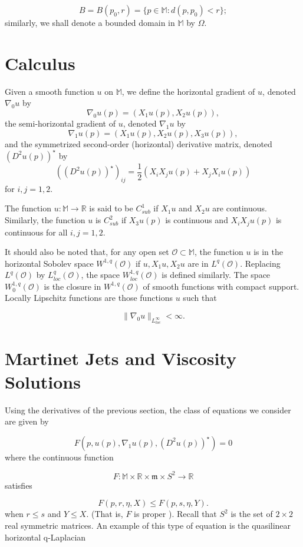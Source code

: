 \documentclass[reqno]{amsart}
\begin{document}
\[B=B(p_0,r)=\{p\in\mathbb{M}:d(p,p_0)<r\};\]
similarly, we shall denote a bounded domain in $\mathbb{M}$ by $\Omega$.
\section{Calculus}
Given a smooth function $u$ on $\mathbb{M}$, we define the horizontal gradient of $u$, denoted $\nabla_0u$ by 
\[\nabla_0u(p)=(X_1u(p),X_2u(p)),\]
the semi-horizontal gradient of $u$, denoted $\nabla_1u$ by 
\[\nabla_1u(p)=(X_1u(p),X_2u(p), X_3u(p)),\]
and the symmetrized second-order (horizontal) derivative matrix, denoted $(D^2u(p))^\star$ by
\[((D^2u(p))^\star)_{ij}=\frac{1}{2}(X_iX_ju(p)+X_jX_iu(p))\]
for $i,j=1,2$.

\begin{definition}
The function $u:\mathbb{M}\to\mathbb{R}$ is said to be $C_{sub}^1$ if $X_1u$ and $X_2u$ are continuous. Similarly, the function $u$ is $C_{sub}^2$ if $X_3u(p)$ is continuous and $X_iX_ju(p)$ is continuous for all $i,j=1,2$.
\end{definition}

It should also be noted that, for any open set $\mathcal{O}\subset\mathbb{M}$, the function $u$ is in the horizontal Sobolev space $W^{1,q}(\mathcal{O})$ if $u, X_1u,X_2u$ are in $L^q(\mathcal{O})$. Replacing $L^q(\mathcal{O})$ by $L^q_{loc}(\mathcal{O})$, the space $W^{1,q}_{loc}(\mathcal{O})$ is defined similarly. The space $W^{1,q}_0(\mathcal{O})$ is the closure in $W^{1,q}(\mathcal{O})$ of smooth functions with compact support. Locally Lipschitz functions are those functions $u$ such that 

\[\|\nabla_0u\|_{L^\infty_{loc}}<\infty.\]
\section{Martinet Jets and Viscosity Solutions}
Using the derivatives of the previous section, the class of equations we consider are given by

\begin{equation}\label{geneq}
F(p,u(p),\nabla_1u(p),(D^2u(p))^\star)=0
\end{equation}
where the continuous function 

\[F:\mathbb{M}\times\mathbb{R}\times  \mathfrak{m}\times S^2\to\mathbb{R}\]
satisfies

\[F(p,r,\eta,X)\leq F(p,s,\eta, Y).\]
when $r\leq s$ and $Y\leq X$. (That is, $F$ is proper \cite{CIL:UGTVS}). Recall that $S^2$ is the set of $2\times 2$ real symmetric matrices. An example of this type of equation is the quasilinear horizontal q-Laplacian
\end{document}
